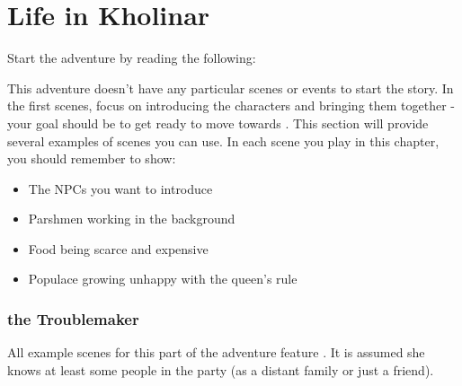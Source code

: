 \section{Life in Kholinar}
\label{sec:kholinarLife}

Start the adventure by reading the following:


This adventure doesn't have any particular scenes or events to start the story. In the first scenes, focus on introducing the characters and bringing them together - your goal should be to get ready to move towards . This section will provide several examples of scenes you can use. In each scene you play in this chapter, you should remember to show:

\begin{itemize}
	\item The NPCs you want to introduce
	\item Parshmen working in the background
	\item Food being scarce and expensive
	\item Populace growing unhappy with the queen's rule
\end{itemize}


\newpage
\subsubsection{\npcTroublemaker{} the Troublemaker}

All example scenes for this part of the adventure feature \npcTroublemaker{}. It is assumed she knows at least some people in the party (as a distant family or just a friend).

